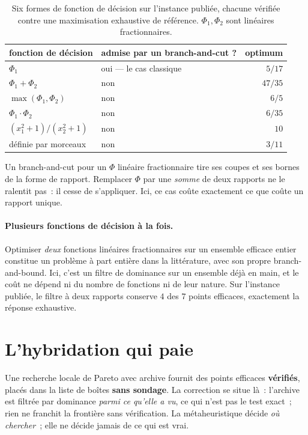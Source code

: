 \documentclass[12pt,a4paper]{report}
\theoremstyle{plain}
\theoremstyle{definition}
\begin{document}
\begin{table}[h]
\centering
\caption{Six formes de fonction de décision sur l'instance publiée, chacune
vérifiée contre une maximisation exhaustive de référence.  $\Phi_1,\Phi_2$ sont
linéaires fractionnaires.}
\begin{tabular}{llr}
\toprule
fonction de décision & admise par un branch-and-cut ? & optimum \\
\midrule
$\Phi_1$                        & oui --- le cas classique & $5/17$ \\
$\Phi_1 + \Phi_2$               & non & $47/35$ \\
$\max(\Phi_1,\Phi_2)$           & non & $6/5$ \\
$\Phi_1 \cdot \Phi_2$           & non & $6/35$ \\
$(x_1^2+1)/(x_2^2+1)$           & non & $10$ \\
définie par morceaux            & non & $3/11$ \\
\bottomrule
\end{tabular}
\end{table}

\noindent
Un branch-and-cut pour un $\Phi$ linéaire fractionnaire tire ses coupes et ses
bornes de la forme de rapport.  Remplacer $\Phi$ par une \emph{somme} de deux
rapports ne le ralentit pas~: il cesse de s'appliquer.  Ici, ce cas coûte
exactement ce que coûte un rapport unique.

\paragraph{Plusieurs fonctions de décision à la fois.}
Optimiser \emph{deux} fonctions linéaires fractionnaires sur un ensemble
efficace entier constitue un problème à part entière dans la littérature, avec
son propre branch-and-bound.  Ici, c'est un filtre de dominance sur un ensemble
déjà en main, et le coût ne dépend ni du nombre de fonctions ni de leur nature.
Sur l'instance publiée, le filtre à deux rapports conserve $4$ des $7$ points
efficaces, exactement la réponse exhaustive.

\section{L'hybridation qui paie}
\label{sec:hybride}

Une recherche locale de Pareto avec archive fournit des points efficaces
\textbf{vérifiés}, placés dans la liste de boîtes \textbf{sans sondage}.  La
correction se situe là~: l'archive est filtrée par dominance \emph{parmi ce
qu'elle a vu}, ce qui n'est pas le test exact~; rien ne franchit la frontière
sans vérification.  La métaheuristique décide \emph{où chercher}~; elle ne
décide jamais de ce qui est vrai.
\end{document}
